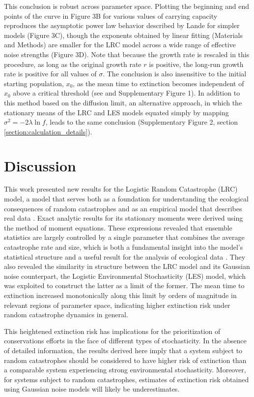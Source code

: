 This conclusion is robust across parameter space.  Plotting the beginning and end points of the curve in Figure 3B for various values of carrying capacity reproduces the asymptotic power law behavior described by Lande for simpler models \cite{lande1993risks} (Figure 3C), though the exponents obtained by linear fitting (Materials and Methods) are smaller for the LRC model across a wide range of effective noise strengths (Figure 3D).  Note that because the growth rate is rescaled in this procedure, as long as the original growth rate $r$ is positive, the long-run growth rate \cite{lande1993risks} is positive for all values of $\sigma$.  The conclusion is also insensitive to the initial starting population, $x_0$, as the mean time to extinction becomes independent of $x_0$ above a critical threshold (see \cite{landeBook,hanson1981} and Supplementary Figure 1).  In addition to this method based on the diffusion limit, an alternative approach, in which the stationary means of the LRC and LES models equated simply by mapping $\sigma^2 = -2\lambda\ln f$, leads to the same conclusion (Supplementary Figure 2, section \ref{section:calculation_details}).


\section{Discussion}

This work presented new results for the Logistic Random Catastrophe (LRC) model, a model that serves both as a foundation for understanding the ecological consequences of random catastrophes and as an empirical model that describes real data \cite{hanson1981,wiles_host_2016}.  Exact analytic results for its stationary moments were derived using the method of moment equations.  These expressions revealed that ensemble statistics are largely controlled by a single parameter that combines the average catastrophe rate and size, which is both a fundamental insight into the model's statistical structure and a useful result for the analysis of ecological data \cite{wiles_host_2016}.  They also revealed the similarity in structure between the LRC model and its Gaussian noise counterpart, the Logistic Environmental Stochasticity (LES) model, which was exploited to construct the latter as a limit of the former.  The mean time to extinction increased monotonically along this limit by orders of magnitude in relevant regions of parameter space, indicating higher extinction risk under random catastrophe dynamics in general.  

This heightened extinction risk has implications for the prioritization of conservations efforts in the face of different types of stochasticity.  In the absence of detailed information, the results derived here imply that a system subject to random catastrophes should be considered to have higher risk of extinction than a comparable system experiencing strong environmental stochasticity.  Moreover, for systems subject to random catastrophes, estimates of extinction risk obtained using Gaussian noise models will likely be underestimates.  

